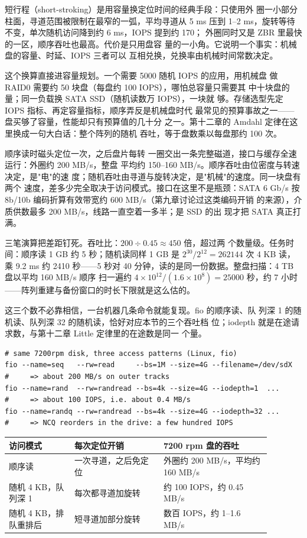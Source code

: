 短行程（short-stroking）是用容量换定位时间的经典手段：只使用外
圈一小部分柱面，寻道范围被限制在最窄的一弧，平均寻道从 5 ms 压到
1--2 ms，旋转等待不变，单次随机访问降到约 6 ms，IOPS 提到约 170；
外圈同时又是 ZBR 里最快的一区，顺序吞吐也最高。代价是只用盘容
量的一小角。它说明一个事实：机械盘的容量、时延、IOPS 三者可以
互相兑换，兑换率由机械时间常数决定。

这个换算直接进容量规划。一个需要 5000 随机 IOPS 的应用，用机械盘
做 RAID0 需要约 50 块盘（每盘约 100 IOPS），哪怕总容量只需要其
中十块盘的量；同一负载换 SATA SSD（随机读数万 IOPS），一块就
够。存储选型先定 IOPS 指标、再定容量指标，顺序弄反是机械盘时代
最常见的预算事故之一——盘买够了容量，性能却只有预算值的几十分
之一。第十二章的 Amdahl 定律在这里换成一句大白话：整个阵列的随机
吞吐，等于盘数乘以每盘那约 100 次。

顺序读时磁头定位一次，之后盘片每转
一圈交出一条完整磁道，接口与缓存全速运行：外圈约 200 MB/s，整盘
平均约 150--160 MB/s。顺序吞吐由位密度与转速决定，是"电"的速
度；随机吞吐由寻道与旋转决定，是"机械"的速度。同一块盘有两个
速度，差多少完全取决于访问模式。接口在这里不是瓶颈：SATA 6 Gb/s
按 8b/10b 编码折算有效带宽约 600 MB/s（第九章讨论过这类编码开销
的来源），介质供数最多 200 MB/s，线路一直空着一多半；是 SSD 的出
现才把 SATA 真正打满。

三笔演算把差距钉死。吞吐比：$200\div0.45\approx450$ 倍，超过两
个数量级。任务时间：顺序读 1 GB 约 5 秒；随机读同样 1 GB 是
$2^{30}/2^{12}=262144$ 次 4 KB 读，乘 9.2 ms 约 2410 秒——5 秒对
40 分钟，读的是同一份数据。整盘扫描：4 TB 盘以平均 160 MB/s 顺序
扫一遍约 $4\times10^{12}/(1.6\times10^{8})=25000$ 秒，约 7 小时
——阵列重建与备份窗口的时长下限就是这么估的。

这三个数不必靠相信，一台机器几条命令就能复现。fio 的顺序读、队
列深 1 的随机读、队列深 32 的随机读，恰好对应本节的三个吞吐档
位；iodepth 就是在途请求数，与第十二章 Little 定律里的在途数是同一
个量。

\begin{lstlisting}
# same 7200rpm disk, three access patterns (Linux, fio)
fio --name=seq   --rw=read     --bs=1M --size=4G --filename=/dev/sdX
#     => about 200 MB/s on outer tracks
fio --name=rand  --rw=randread --bs=4k --size=4G --iodepth=1  ...
#     => about 100 IOPS, i.e. about 0.4 MB/s
fio --name=randq --rw=randread --bs=4k --size=4G --iodepth=32 ...
#     => NCQ reorders in the drive: a few hundred IOPS
\end{lstlisting}

\begin{longtable}{L{0.22\linewidth}L{0.30\linewidth}L{0.36\linewidth}}
\toprule
访问模式 & 每次定位开销 & 7200 rpm 盘的吞吐 \\
\midrule
顺序读 & 一次寻道，之后免定位 & 外圈约 200 MB/s，平均约 160 MB/s \\
随机 4 KB，队列深 1 & 每次都寻道加旋转 & 约 100 IOPS，约 0.45 MB/s \\
随机 4 KB，排队重排后 & 短寻道加部分旋转 & 数百 IOPS，约 1--1.6 MB/s \\
\bottomrule
\end{longtable}

